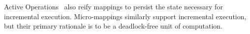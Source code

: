 \documentclass{llncs}
\begin{document}
Active Operations~\cite{Jouault-ActiveOperations} also reify mappings 
to persist the state necessary for incremental execution. Micro-mappings similarly support incremental execution, but their primary rationale is to be a deadlock-free unit of computation.










\end{document}
